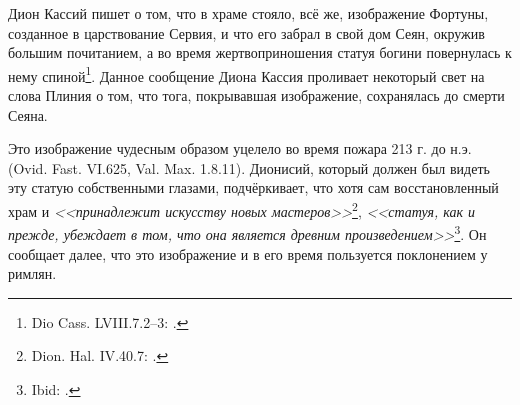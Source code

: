 Дион Кассий пишет о том, что в храме стояло, всё же, изображение Фортуны, созданное в царствование Сервия, и что его забрал в свой дом Сеян, окружив большим почитанием, а во время жертвоприношения статуя богини повернулась к нему спиной\footnote{Dio Cass. LVIII.7.2--3: .}. Данное сообщение Диона Кассия проливает некоторый свет на слова Плиния о том, что тога, покрывавшая изображение, сохранялась до смерти Сеяна.

Это изображение чудесным образом уцелело во время пожара 213 г. до н.э. (Ovid. Fast. VI.625, Val. Max. 1.8.11). Дионисий, который должен был видеть эту статую собственными глазами, подчёркивает, что хотя сам восстановленный храм и \textit{<<принадлежит искусству новых мастеров>>}\footnote{Dion. Hal. IV.40.7: .}, \textit{<<статуя, как и прежде, убеждает в том, что она является древним произведением>>}\footnote{Ibid: .}. Он сообщает далее, что это изображение и в его время пользуется поклонением у римлян.


